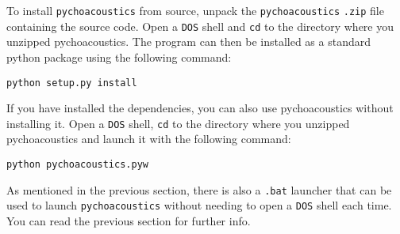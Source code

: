 To install \texttt{pychoacoustics} from source, unpack the \texttt{pychoacoustics} 
\texttt{.zip} file containing the source code. Open a \texttt{DOS} shell and \texttt{cd} 
to the directory where you unzipped pychoacoustics. The program can then be installed 
as a standard python package using the following command:
\begin{verbatim}
python setup.py install
\end{verbatim}
If you have installed the dependencies, you can also use pychoacoustics without installing it.
Open a \texttt{DOS} shell, \texttt{cd} to the directory where you unzipped pychoacoustics and launch it with the following command:
\begin{verbatim}
python pychoacoustics.pyw
\end{verbatim}
As mentioned in the previous section, there is also a \texttt{.bat} launcher that can be used to launch
\texttt{pychoacoustics} without needing to open a \texttt{DOS} shell each time. You can read the previous
section for further info.



